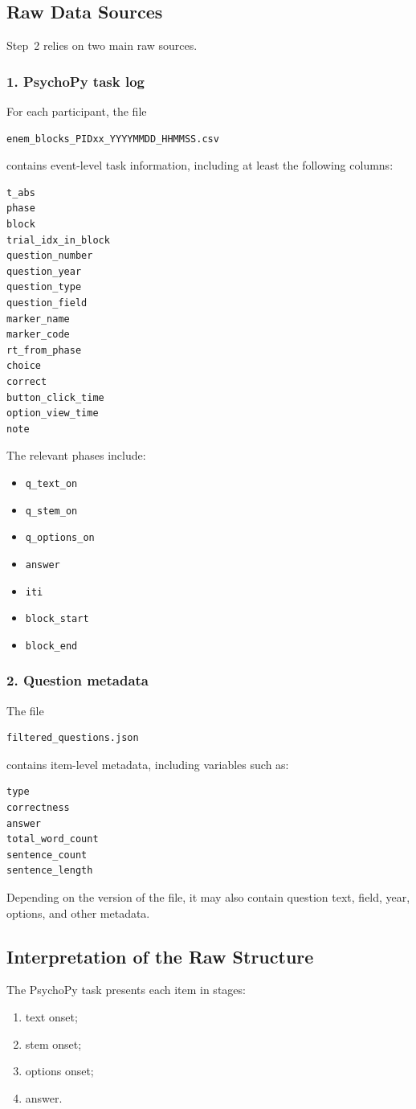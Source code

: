 \subsection{Raw Data Sources}
Step~2 relies on two main raw sources.

\subsubsection*{1. PsychoPy task log}
For each participant, the file
\begin{verbatim}
enem_blocks_PIDxx_YYYYMMDD_HHMMSS.csv
\end{verbatim}
contains event-level task information, including at least the following columns:
\begin{verbatim}
t_abs
phase
block
trial_idx_in_block
question_number
question_year
question_type
question_field
marker_name
marker_code
rt_from_phase
choice
correct
button_click_time
option_view_time
note
\end{verbatim}

The relevant phases include:
\begin{itemize}
    \item \texttt{q\_text\_on}
    \item \texttt{q\_stem\_on}
    \item \texttt{q\_options\_on}
    \item \texttt{answer}
    \item \texttt{iti}
    \item \texttt{block\_start}
    \item \texttt{block\_end}
\end{itemize}

\subsubsection*{2. Question metadata}
The file
\begin{verbatim}
filtered_questions.json
\end{verbatim}
contains item-level metadata, including variables such as:
\begin{verbatim}
type
correctness
answer
total_word_count
sentence_count
sentence_length
\end{verbatim}

Depending on the version of the file, it may also contain question text, field, year, options, and other metadata.

\subsection{Interpretation of the Raw Structure}
The PsychoPy task presents each item in stages:
\begin{enumerate}
    \item text onset;
    \item stem onset;
    \item options onset;
    \item answer.
\end{enumerate}

